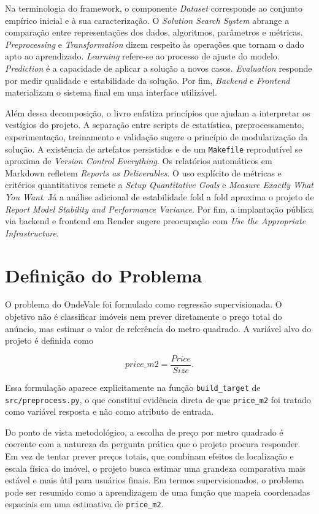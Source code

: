 \documentclass[12pt]{report}
\begin{document}
Na terminologia do framework, o componente \textit{Dataset} corresponde ao conjunto empírico inicial e à sua caracterização. O \textit{Solution Search System} abrange a comparação entre representações dos dados, algoritmos, parâmetros e métricas. \textit{Preprocessing} e \textit{Transformation} dizem respeito às operações que tornam o dado apto ao aprendizado. \textit{Learning} refere-se ao processo de ajuste do modelo. \textit{Prediction} é a capacidade de aplicar a solução a novos casos. \textit{Evaluation} responde por medir qualidade e estabilidade da solução. Por fim, \textit{Backend} e \textit{Frontend} materializam o sistema final em uma interface utilizável.

Além dessa decomposição, o livro enfatiza princípios que ajudam a interpretar os vestígios do projeto. A separação entre scripts de estatística, preprocessamento, experimentação, treinamento e validação sugere o princípio de modularização da solução. A existência de artefatos persistidos e de um \texttt{Makefile} reprodutível se aproxima de \textit{Version Control Everything}. Os relatórios automáticos em Markdown refletem \textit{Reports as Deliverables}. O uso explícito de métricas e critérios quantitativos remete a \textit{Setup Quantitative Goals} e \textit{Measure Exactly What You Want}. Já a análise adicional de estabilidade fold a fold aproxima o projeto de \textit{Report Model Stability and Performance Variance}. Por fim, a implantação pública via backend e frontend em Render sugere preocupação com \textit{Use the Appropriate Infrastructure}.

\chapter{Definição do Problema}

O problema do OndeVale foi formulado como regressão supervisionada. O objetivo não é classificar imóveis nem prever diretamente o preço total do anúncio, mas estimar o valor de referência do metro quadrado. A variável alvo do projeto é definida como

\[
price\_m2 = \frac{Price}{Size}.
\]

Essa formulação aparece explicitamente na função \texttt{build\_target} de \texttt{src/preprocess.py}, o que constitui evidência direta de que \texttt{price\_m2} foi tratado como variável resposta e não como atributo de entrada.

Do ponto de vista metodológico, a escolha de preço por metro quadrado é coerente com a natureza da pergunta prática que o projeto procura responder. Em vez de tentar prever preços totais, que combinam efeitos de localização e escala física do imóvel, o projeto busca estimar uma grandeza comparativa mais estável e mais útil para usuários finais. Em termos supervisionados, o problema pode ser resumido como a aprendizagem de uma função que mapeia coordenadas espaciais em uma estimativa de \texttt{price\_m2}.
\end{document}
